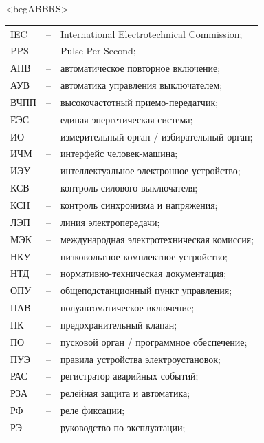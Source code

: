 \color{unimain}\section*{}
{\color{white}\fontsize{0.1pt}{0.1pt}\selectfont<begABBRS>}
\color{black}
\begin{longtable}{>{\raggedright\arraybackslash}m{2cm}>{\raggedright\arraybackslash}m{0.5cm}>{\raggedright\arraybackslash}m{20cm}}
\endfirsthead\endhead\endfoot\endlastfoot
IEC & -- &  International Electrotechnical Commission; \\
PPS & -- & Pulse Per Second; \\
АПВ & -- & автоматическое повторное включение; \\
АУВ & -- & автоматика управления выключателем; \\
ВЧПП & -- & высокочастотный приемо-передатчик; \\
ЕЭС & -- & единая энергетическая система; \\
ИО & -- & измерительный орган / избирательный орган; \\
ИЧМ & -- & интерфейс человек-машина; \\
ИЭУ & -- & интеллектуальное электронное устройство; \\
КСВ & -- & контроль силового выключателя; \\
КСН & -- & контроль синхронизма и напряжения; \\
ЛЭП & -- & линия электропередачи; \\
МЭК & -- & международная электротехническая комиссия; \\
НКУ & -- & низковольтное комплектное устройство; \\
НТД & -- & нормативно-техническая документация; \\
ОПУ & -- & общеподстанционный пункт управления; \\
ПАВ & -- & полуавтоматическое включение; \\
ПК & -- & предохранительный клапан; \\
ПО & -- & пусковой орган / программное обеспечение; \\
ПУЭ & -- & правила устройства электроустановок; \\
РАС & -- & регистратор аварийных событий; \\
РЗА & -- & релейная защита и автоматика; \\
РФ & -- & реле фиксации; \\
РЭ & -- & руководство по эксплуатации; \\

\end{longtable}
